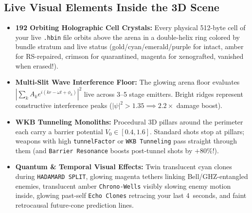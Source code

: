 \documentclass[10pt,letterpaper]{article}
\begin{document}
\subsection{Live Visual Elements Inside the 3D Scene}
\begin{itemize}[leftmargin=1.5em, itemsep=1.5pt]
  \item \textbf{192 Orbiting Holographic Cell Crystals:} Every physical 512-byte cell of your live \texttt{.hbin} file orbits above the arena in a double-helix ring colored by bundle stratum and live status (gold/cyan/emerald/purple for intact, amber for RS-repaired, crimson for quarantined, magenta for xenografted, vanished when erased!).
  \item \textbf{Multi-Slit Wave Interference Floor:} The glowing arena floor evaluates $|\sum_k A_k e^{i(k r - \omega t + \phi_k)}|^2$ live across 3--5 stage emitters. Bright ridges represent constructive interference peaks ($|\psi|^2 > 1.35 \implies 2.2\times$ damage boost).
  \item \textbf{WKB Tunneling Monoliths:} Procedural 3D pillars around the perimeter each carry a barrier potential $V_0 \in [0.4, 1.6]$. Standard shots stop at pillars; weapons with high \texttt{tunnelFactor} or \texttt{WKB Tunneling} pass straight through them (and \texttt{Barrier Resonance} boosts post-tunnel shots by $+80\%$!).
  \item \textbf{Quantum \& Temporal Visual Effects:} Twin translucent cyan clones during \texttt{HADAMARD SPLIT}, glowing magenta tethers linking Bell/GHZ-entangled enemies, translucent amber \texttt{Chrono-Wells} visibly slowing enemy motion inside, glowing past-self \texttt{Echo Clones} retracing your last 4~seconds, and faint retrocausal future-cone prediction lines.
\end{itemize}
\end{document}
